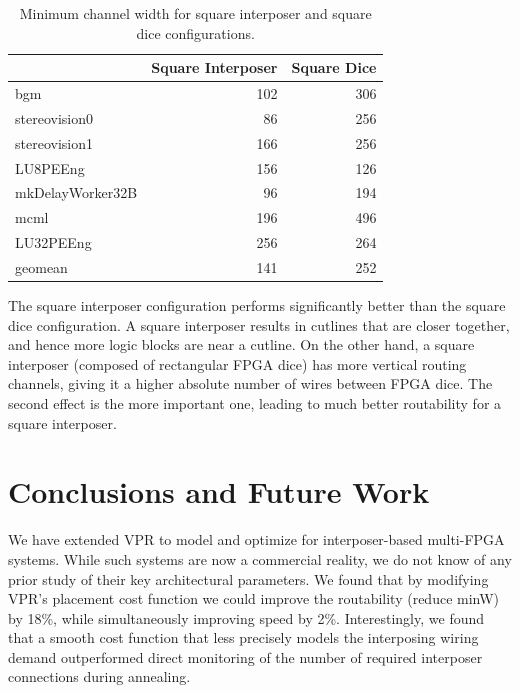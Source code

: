 \documentclass[journal]{IEEEtran}
\begin{document}
\begin{table}[!htbp]
\centering
\begin{tabular}{|l|r|r|}
\hline
 & Square Interposer & Square Dice \\ \hline \hline
bgm & 102 & 306 \\ \hline
stereovision0 & 86 & 256 \\ \hline
stereovision1 & 166 & 256 \\ \hline
LU8PEEng & 156 & 126 \\ \hline
mkDelayWorker32B & 96 & 194 \\ \hline
mcml & 196 & 496 \\ \hline
LU32PEEng & 256 & 264 \\ \hline
geomean & 141 & 252 \\ \hline
\end{tabular}
\caption{Minimum channel width for square interposer and square dice configurations.}
\label{table:squares}
\end{table}

The square interposer configuration performs significantly better than the square dice configuration. A square interposer results in cutlines that are closer together, and hence more logic blocks are near a cutline. On the other hand, a square interposer (composed of rectangular FPGA dice) has more vertical routing channels, giving it a higher absolute number of wires between FPGA dice. The second effect is the more important one, leading to much better routability for a square interposer.

\section{Conclusions and Future Work}
\label{conclusionSection}
We have extended VPR to model and optimize for interposer-based multi-FPGA systems. While such systems are now a commercial reality, we do not know of any prior study of their key architectural parameters. We found that by modifying VPR's placement cost function we could improve the routability (reduce minW) by 18\%, while simultaneously improving speed by 2\%. Interestingly, we found that a smooth cost function that less precisely models the interposing wiring demand outperformed direct monitoring of the number of required interposer connections during annealing.
\end{document}
